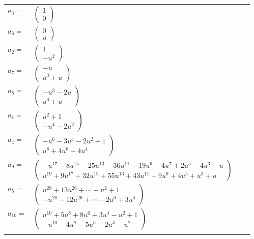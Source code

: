 \documentclass[1p]{elsarticle_modified}
\theoremstyle{definition}
\begin{document}
\begin{tabular}{m{7pt} m{180pt} m{7pt} m{180pt} }
\flushright $a_{3}=$&$\begin{pmatrix}1\\0\end{pmatrix}$ \\
\flushright $a_{6}=$&$\begin{pmatrix}0\\u\end{pmatrix}$ \\
\flushright $a_{2}=$&$\begin{pmatrix}1\\- u^2\end{pmatrix}$ \\
\flushright $a_{7}=$&$\begin{pmatrix}- u\\u^3+u\end{pmatrix}$ \\
\flushright $a_{8}=$&$\begin{pmatrix}- u^3-2 u\\u^3+u\end{pmatrix}$ \\
\flushright $a_{1}=$&$\begin{pmatrix}u^2+1\\- u^4-2 u^2\end{pmatrix}$ \\
\flushright $a_{4}=$&$\begin{pmatrix}- u^6-3 u^4-2 u^2+1\\u^8+4 u^6+4 u^4\end{pmatrix}$ \\
\flushright $a_{9}=$&$\begin{pmatrix}- u^{17}-8 u^{15}-25 u^{13}-36 u^{11}-19 u^9+4 u^7+2 u^5-4 u^3- u\\u^{19}+9 u^{17}+32 u^{15}+55 u^{13}+43 u^{11}+9 u^9+4 u^5+u^3+u\end{pmatrix}$ \\
\flushright $a_{5}=$&$\begin{pmatrix}u^{28}+13 u^{26}+\cdots- u^2+1\\- u^{28}-12 u^{26}+\cdots-2 u^6+3 u^4\end{pmatrix}$ \\
\flushright $a_{10}=$&$\begin{pmatrix}u^{10}+5 u^8+8 u^6+3 u^4- u^2+1\\- u^{10}-4 u^8-5 u^6-2 u^4- u^2\end{pmatrix}$\\&\end{tabular}
\end{document}
